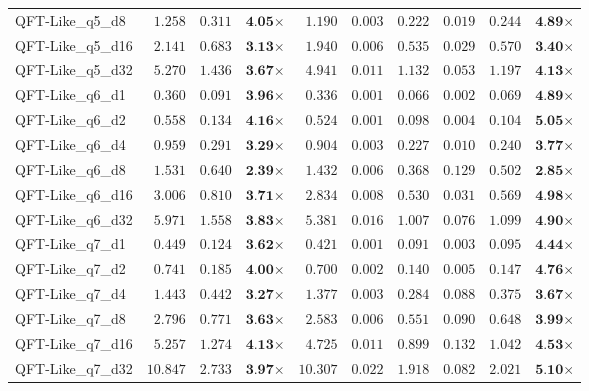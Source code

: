 \begin{table*}[t]
{\begin{tabular}{| l || r r c || r r r r r c |}
QFT-Like\_q5\_d8 & $1.258$ & $0.311$ & $\textbf{4.05}$$\times$ & $1.190$ & $0.003$ & $0.222$ & $0.019$ & $0.244$ & $\textbf{4.89}$$\times$ \\
QFT-Like\_q5\_d16 & $2.141$ & $0.683$ & $\textbf{3.13}$$\times$ & $1.940$ & $0.006$ & $0.535$ & $0.029$ & $0.570$ & $\textbf{3.40}$$\times$ \\
QFT-Like\_q5\_d32 & $5.270$ & $1.436$ & $\textbf{3.67}$$\times$ & $4.941$ & $0.011$ & $1.132$ & $0.053$ & $1.197$ & $\textbf{4.13}$$\times$ \\
QFT-Like\_q6\_d1 & $0.360$ & $0.091$ & $\textbf{3.96}$$\times$ & $0.336$ & $0.001$ & $0.066$ & $0.002$ & $0.069$ & $\textbf{4.89}$$\times$ \\
QFT-Like\_q6\_d2 & $0.558$ & $0.134$ & $\textbf{4.16}$$\times$ & $0.524$ & $0.001$ & $0.098$ & $0.004$ & $0.104$ & $\textbf{5.05}$$\times$ \\
QFT-Like\_q6\_d4 & $0.959$ & $0.291$ & $\textbf{3.29}$$\times$ & $0.904$ & $0.003$ & $0.227$ & $0.010$ & $0.240$ & $\textbf{3.77}$$\times$ \\
QFT-Like\_q6\_d8 & $1.531$ & $0.640$ & $\textbf{2.39}$$\times$ & $1.432$ & $0.006$ & $0.368$ & $0.129$ & $0.502$ & $\textbf{2.85}$$\times$ \\
QFT-Like\_q6\_d16 & $3.006$ & $0.810$ & $\textbf{3.71}$$\times$ & $2.834$ & $0.008$ & $0.530$ & $0.031$ & $0.569$ & $\textbf{4.98}$$\times$ \\
QFT-Like\_q6\_d32 & $5.971$ & $1.558$ & $\textbf{3.83}$$\times$ & $5.381$ & $0.016$ & $1.007$ & $0.076$ & $1.099$ & $\textbf{4.90}$$\times$ \\
QFT-Like\_q7\_d1 & $0.449$ & $0.124$ & $\textbf{3.62}$$\times$ & $0.421$ & $0.001$ & $0.091$ & $0.003$ & $0.095$ & $\textbf{4.44}$$\times$ \\
QFT-Like\_q7\_d2 & $0.741$ & $0.185$ & $\textbf{4.00}$$\times$ & $0.700$ & $0.002$ & $0.140$ & $0.005$ & $0.147$ & $\textbf{4.76}$$\times$ \\
QFT-Like\_q7\_d4 & $1.443$ & $0.442$ & $\textbf{3.27}$$\times$ & $1.377$ & $0.003$ & $0.284$ & $0.088$ & $0.375$ & $\textbf{3.67}$$\times$ \\
QFT-Like\_q7\_d8 & $2.796$ & $0.771$ & $\textbf{3.63}$$\times$ & $2.583$ & $0.006$ & $0.551$ & $0.090$ & $0.648$ & $\textbf{3.99}$$\times$ \\
QFT-Like\_q7\_d16 & $5.257$ & $1.274$ & $\textbf{4.13}$$\times$ & $4.725$ & $0.011$ & $0.899$ & $0.132$ & $1.042$ & $\textbf{4.53}$$\times$ \\
QFT-Like\_q7\_d32 & $10.847$ & $2.733$ & $\textbf{3.97}$$\times$ & $10.307$ & $0.022$ & $1.918$ & $0.082$ & $2.021$ & $\textbf{5.10}$$\times$ \\
\hline
\end{tabular}
}
\end{table*}
